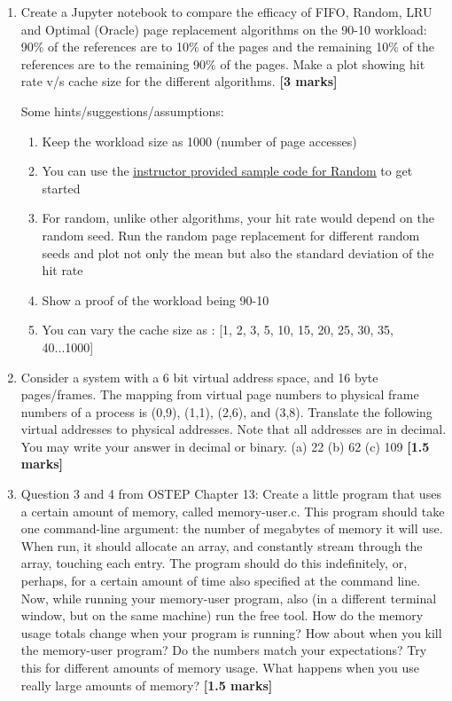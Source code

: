 \documentclass[]{article}
\begin{document}
\begin{enumerate}
	\item Create a Jupyter notebook to compare the efficacy of FIFO, Random, LRU and Optimal (Oracle) page replacement algorithms on the 90-10 workload: 90\% of the references are to 10\% of the pages and the remaining 10\% of the references are to the remaining 90\% of the pages. Make a plot showing hit rate v/s cache size for the different algorithms. \textbf{[3 marks]}
	
	Some hints/suggestions/assumptions:
	\begin{enumerate}
		\item Keep the workload size as 1000 (number of page accesses)
		\item You can use the
		 \underline{\href{https://github.com/nipunbatra/nipunbatra.github.io/blob/master/teaching/os-fall-18/code/replacement-random-plot.py}{instructor provided sample code for Random}} to get started
	\item For random, unlike other algorithms, your hit rate would depend on the random seed. Run the random page replacement for different random seeds and plot not only the mean but also the standard deviation of the hit rate
	\item Show a proof of the workload being 90-10
	\item You can vary the cache size as : [1, 2, 3, 5, 10, 15, 20, 25, 30, 35, 40...1000]
	\end{enumerate}



	
	
	\item Consider a system with a 6 bit virtual address space, and 16 byte pages/frames. The mapping
	from virtual page numbers to physical frame numbers of a process is (0,9), (1,1), (2,6), and
	(3,8). Translate the following virtual addresses to physical addresses. Note that all addresses
	are in decimal. You may write your answer in decimal or binary.  
	(a) 22
	(b) 62
	(c) 109 \textbf{[1.5 marks]}
	
	\item Question 3 and 4 from OSTEP Chapter 13: Create a little program that uses a certain amount of memory, called
	memory-user.c. This program should take one command-line argument:
	the number of megabytes of memory it will use. When run, it should allocate
	an array, and constantly stream through the array, touching each entry.
	The program should do this indefinitely, or, perhaps, for a certain amount
	of time also specified at the command line.
	Now, while running your memory-user program, also (in a different terminal
	window, but on the same machine) run the free tool. How do the
	memory usage totals change when your program is running? How about
	when you kill the memory-user program? Do the numbers match your expectations?
	Try this for different amounts of memory usage. What happens
	when you use really large amounts of memory?  \textbf{[1.5 marks]}
	
\end{enumerate}
\end{document}
